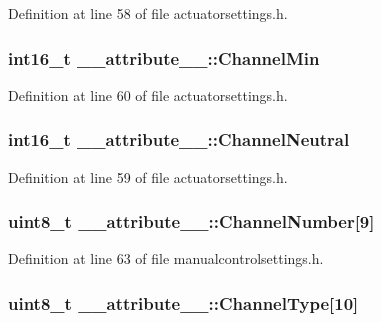 \-Definition at line 58 of file actuatorsettings.\-h.

\hypertarget{struct____attribute_____a273839942ffbb6ddeed9dae3576debed}{
\subsubsection[{\-Channel\-Min}]{\setlength{\rightskip}{0pt plus 5cm}int16\-\_\-t {\bf \-\_\-\-\_\-attribute\-\_\-\-\_\-\-::\-Channel\-Min}}}\label{struct____attribute_____a273839942ffbb6ddeed9dae3576debed}


\-Definition at line 60 of file actuatorsettings.\-h.

\hypertarget{struct____attribute_____aa0e0faaaf5edfd2915dd746d5493898e}{
\subsubsection[{\-Channel\-Neutral}]{\setlength{\rightskip}{0pt plus 5cm}int16\-\_\-t {\bf \-\_\-\-\_\-attribute\-\_\-\-\_\-\-::\-Channel\-Neutral}}}\label{struct____attribute_____aa0e0faaaf5edfd2915dd746d5493898e}


\-Definition at line 59 of file actuatorsettings.\-h.

\hypertarget{struct____attribute_____a8dc687e95a7012aecf507c1f8b4ce97d}{
\subsubsection[{\-Channel\-Number}]{\setlength{\rightskip}{0pt plus 5cm}uint8\-\_\-t {\bf \-\_\-\-\_\-attribute\-\_\-\-\_\-\-::\-Channel\-Number}\mbox{[}9\mbox{]}}}\label{struct____attribute_____a8dc687e95a7012aecf507c1f8b4ce97d}


\-Definition at line 63 of file manualcontrolsettings.\-h.

\hypertarget{struct____attribute_____a77b8f28a2387672c8ca97c5aef20c62a}{
\subsubsection[{\-Channel\-Type}]{\setlength{\rightskip}{0pt plus 5cm}uint8\-\_\-t {\bf \-\_\-\-\_\-attribute\-\_\-\-\_\-\-::\-Channel\-Type}\mbox{[}10\mbox{]}}}\label{struct____attribute_____a77b8f28a2387672c8ca97c5aef20c62a}


